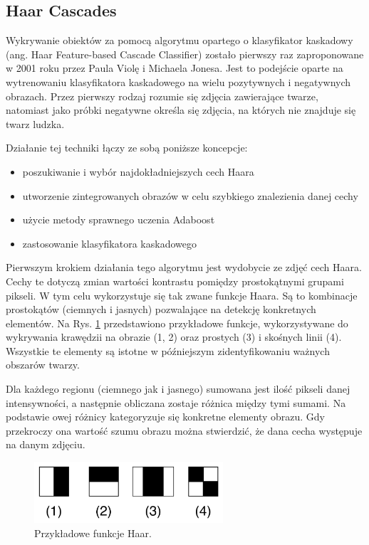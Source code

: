 \subsection{Haar Cascades}
Wykrywanie obiektów za pomocą algorytmu opartego o klasyfikator kaskadowy (ang. Haar Feature-based Cascade Classifier) zostało pierwszy raz zaproponowane w 2001 roku przez Paula Violę i Michaela Jonesa. 
Jest to podejście oparte na wytrenowaniu klasyfikatora kaskadowego na wielu pozytywnych i negatywnych obrazach. Przez pierwszy rodzaj rozumie się zdjęcia zawierające twarze, natomiast jako próbki negatywne określa się zdjęcia, na których nie znajduje się twarz ludzka. 

Działanie tej techniki łączy ze sobą poniższe koncepcje:
\begin{itemize}
    \item poszukiwanie i wybór najdokładniejszych cech Haara
    \item utworzenie zintegrowanych obrazów w celu szybkiego znalezienia danej cechy
    \item użycie metody sprawnego uczenia Adaboost
    \item zastosowanie klasyfikatora kaskadowego%
\end{itemize}

Pierwszym krokiem działania tego algorytmu jest wydobycie ze zdjęć cech Haara. Cechy te dotyczą zmian wartości kontrastu pomiędzy prostokątnymi grupami pikseli. W tym celu wykorzystuje się tak zwane funkcje Haara. Są to kombinacje prostokątów (ciemnych i jasnych) pozwalające na detekcję konkretnych elementów. Na Rys. \ref{fig:haarFeatures} przedstawiono przykładowe funkcje, wykorzystywane do wykrywania krawędzii na obrazie (1, 2) oraz prostych (3) i skośnych linii (4). Wszystkie te elementy są istotne w późniejszym zidentyfikowaniu ważnych obszarów twarzy. 

Dla każdego regionu (ciemnego jak i jasnego) sumowana jest ilość pikseli danej intensywności, a następnie obliczana zostaje różnica między tymi sumami. Na podstawie owej różnicy kategoryzuje się konkretne elementy obrazu. Gdy przekroczy ona wartość szumu obrazu można stwierdzić, że dana cecha występuje na danym zdjęciu.

\begin{figure}[h]
	\centering
	\includegraphics[width=7cm]{haar_features.png}
	\caption{Przykładowe funkcje Haar.} 
	\label{fig:haarFeatures}
\end{figure}
 
